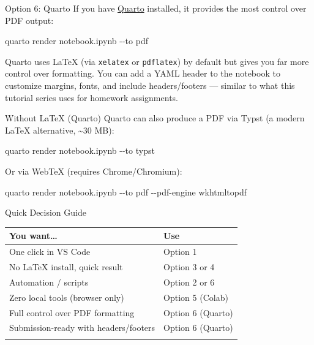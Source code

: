 \documentclass[
  ignorenonframetext,
  aspectratio=169,
]{beamer}
\newenvironment{Shaded}{\begin{snugshade}}{\end{snugshade}}
\newcommand{\AttributeTok}[1]{\textcolor[rgb]{0.40,0.45,0.13}{#1}}
\newcommand{\ExtensionTok}[1]{\textcolor[rgb]{0.00,0.23,0.31}{#1}}
\newcommand{\NormalTok}[1]{\textcolor[rgb]{0.00,0.23,0.31}{#1}}
\newcounter{none} %
\begin{document}
\begin{frame}[fragile]{Option 6: Quarto}
\protect{}\label{option-6-quarto}
If you have \href{https://quarto.org/}{Quarto} installed, it provides
the most control over PDF output:

\begin{Shaded}
\begin{Highlighting}[]
\ExtensionTok{quarto}\NormalTok{ render notebook.ipynb }\AttributeTok{{-}{-}to}\NormalTok{ pdf}
\end{Highlighting}
\end{Shaded}

Quarto uses LaTeX (via \texttt{xelatex} or \texttt{pdflatex}) by default
but gives you far more control over formatting. You can add a YAML
header to the notebook to customize margins, fonts, and include
headers/footers --- similar to what this tutorial series uses for
homework assignments.

\begin{block}{Without LaTeX (Quarto)}
\protect{}\label{without-latex-quarto}
Quarto can also produce a PDF via Typst (a modern LaTeX alternative,
\textasciitilde30 MB):

\begin{Shaded}
\begin{Highlighting}[]
\ExtensionTok{quarto}\NormalTok{ render notebook.ipynb }\AttributeTok{{-}{-}to}\NormalTok{ typst}
\end{Highlighting}
\end{Shaded}

Or via WebTeX (requires Chrome/Chromium):

\begin{Shaded}
\begin{Highlighting}[]
\ExtensionTok{quarto}\NormalTok{ render notebook.ipynb }\AttributeTok{{-}{-}to}\NormalTok{ pdf }\AttributeTok{{-}{-}pdf{-}engine}\NormalTok{ wkhtmltopdf}
\end{Highlighting}
\end{Shaded}
\end{block}
\end{frame}

\begin{frame}{Quick Decision Guide}
\protect{}\label{quick-decision-guide}
{\def\LTcaptype{none} %
\begin{longtable}[]{@{}ll@{}}
\toprule\noalign{}
You want\ldots{} & Use \\
\midrule\noalign{}
\endhead
One click in VS Code & Option 1 \\
No LaTeX install, quick result & Option 3 or 4 \\
Automation / scripts & Option 2 or 6 \\
Zero local tools (browser only) & Option 5 (Colab) \\
Full control over PDF formatting & Option 6 (Quarto) \\
Submission-ready with headers/footers & Option 6 (Quarto) \\
\bottomrule\noalign{}
\end{longtable}
}
\end{frame}
\end{document}
